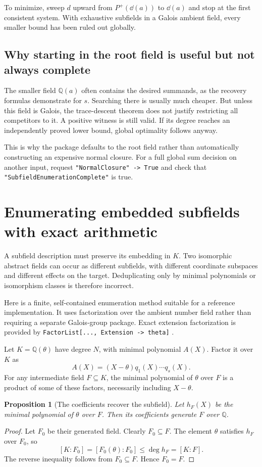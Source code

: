 \documentclass[11pt,a4paper]{article}
\newtheorem{proposition}[theorem]{Proposition}
\theoremstyle{definition}\newtheorem{definition}[theorem]{Definition}
\theoremstyle{remark}\newtheorem{remark}[theorem]{Remark}
\newcommand{\Q}{\mathbb Q}\newcommand{\C}{\mathbb C}\newcommand{\Z}{\mathbb Z}
\newcommand{\wl}[1]{\texttt{#1}}
\begin{document}
To minimize, sweep $d$ upward from $P^+(\dd(a))$ to $\dd(a)$ and stop at the first consistent system. With exhaustive subfields in a Galois ambient field, every smaller bound has been ruled out globally.

\subsection{Why starting in the root field is useful but not always complete}
The smaller field $\Q(a)$ often contains the desired summands, as the recovery formulas demonstrate for $s$. Searching there is usually much cheaper. But unless this field is Galois, the trace-descent theorem does not justify restricting all competitors to it. A positive witness is still valid. If its degree reaches an independently proved lower bound, global optimality follows anyway.

This is why the package defaults to the root field rather than automatically constructing an expensive normal closure. For a full global sum decision on another input, request \wl{"NormalClosure" -> True} and check that \wl{"SubfieldEnumerationComplete"} is true.

\section{Enumerating embedded subfields with exact arithmetic}
\label{sec:subfields}
A subfield description must preserve its embedding in $K$. Two isomorphic abstract fields can occur as different subfields, with different coordinate subspaces and different effects on the target. Deduplicating only by minimal polynomials or isomorphism classes is therefore incorrect.

Here is a finite, self-contained enumeration method suitable for a reference implementation. It uses factorization over the ambient number field rather than requiring a separate Galois-group package. Exact extension factorization is provided by \wl{FactorList[..., Extension -> theta]} \cite{factorlist}.

Let $K=\Q(\theta)$ have degree $N$, with minimal polynomial $A(X)$. Factor it over $K$ as
\[
 A(X)=(X-\theta)q_1(X)\cdots q_s(X).
\]
For any intermediate field $F\subseteq K$, the minimal polynomial of $\theta$ over $F$ is a product of some of these factors, necessarily including $X-\theta$.

\begin{proposition}[The coefficients recover the subfield]
\label{prop:coefffield}
Let $h_F(X)$ be the minimal polynomial of $\theta$ over $F$. Then its coefficients generate $F$ over $\Q$.
\end{proposition}
\begin{proof}
Let $F_0$ be their generated field. Clearly $F_0\subseteq F$. The element $\theta$ satisfies $h_F$ over $F_0$, so
\[
 [K:F_0]=[F_0(\theta):F_0]\le\deg h_F=[K:F].
\]
The reverse inequality follows from $F_0\subseteq F$. Hence $F_0=F$.
\end{proof}
\end{document}
